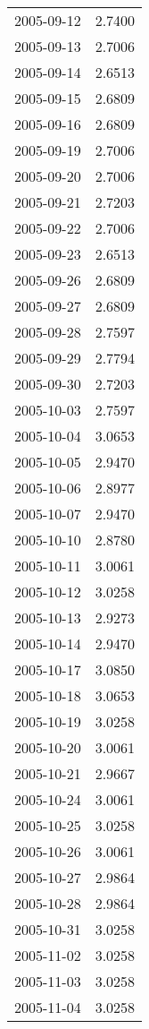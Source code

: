 \begin{tabular}{lr}
2005-09-12 &      2.7400 \\
2005-09-13 &      2.7006 \\
2005-09-14 &      2.6513 \\
2005-09-15 &      2.6809 \\
2005-09-16 &      2.6809 \\
2005-09-19 &      2.7006 \\
2005-09-20 &      2.7006 \\
2005-09-21 &      2.7203 \\
2005-09-22 &      2.7006 \\
2005-09-23 &      2.6513 \\
2005-09-26 &      2.6809 \\
2005-09-27 &      2.6809 \\
2005-09-28 &      2.7597 \\
2005-09-29 &      2.7794 \\
2005-09-30 &      2.7203 \\
2005-10-03 &      2.7597 \\
2005-10-04 &      3.0653 \\
2005-10-05 &      2.9470 \\
2005-10-06 &      2.8977 \\
2005-10-07 &      2.9470 \\
2005-10-10 &      2.8780 \\
2005-10-11 &      3.0061 \\
2005-10-12 &      3.0258 \\
2005-10-13 &      2.9273 \\
2005-10-14 &      2.9470 \\
2005-10-17 &      3.0850 \\
2005-10-18 &      3.0653 \\
2005-10-19 &      3.0258 \\
2005-10-20 &      3.0061 \\
2005-10-21 &      2.9667 \\
2005-10-24 &      3.0061 \\
2005-10-25 &      3.0258 \\
2005-10-26 &      3.0061 \\
2005-10-27 &      2.9864 \\
2005-10-28 &      2.9864 \\
2005-10-31 &      3.0258 \\
2005-11-02 &      3.0258 \\
2005-11-03 &      3.0258 \\
2005-11-04 &      3.0258 \\

\end{tabular}

